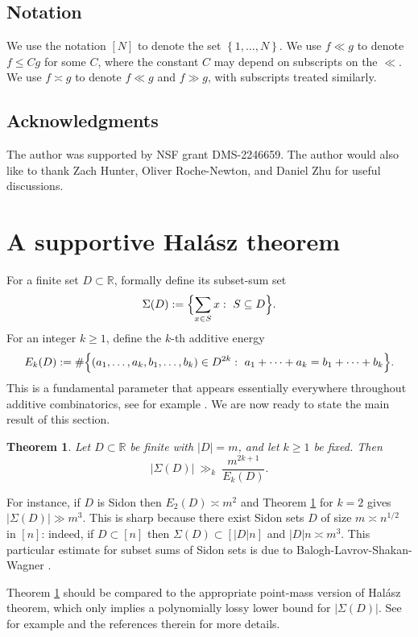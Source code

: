 \documentclass[12pt]{amsart}
\newtheorem{theorem}{Theorem}[section]
\theoremstyle{definition}
\theoremstyle{remark}
\newcommand{\RR}{\mathbb{R}}
\newcommand{\abs}[1]{\left|#1\right|}
\newcommand{\bigset}[1]{\Bigl\{#1\Bigr\}}
\newcommand{\Sig}{\Sigma}
\begin{document}
\smallskip
\subsection*{Notation} We use the notation $[N]$ to denote the set $\left\{1,\ldots,N\right\}$. We use $f \ll g$ to denote $f \leq Cg$ for some $C$, where the constant $C$ may depend on subscripts on the $\ll$. We use $f \asymp g$ to denote $f \ll g$ and $f \gg g$, with subscripts treated similarly.

\smallskip
\subsection*{Acknowledgments} 
The author was supported by NSF grant DMS-2246659. The author would also like to thank Zach Hunter, Oliver Roche-Newton, and Daniel Zhu for useful discussions.  

\smallskip
\section{A supportive Hal\'asz theorem} \label{sec:supportive}

For a finite set $D\subset\RR$, formally define its subset-sum set
\[
\Sig(D):=\bigset{\sum_{x\in S}x:\ S\subseteq D}.
\]
For an integer $k\ge 1$, define the $k$-th additive energy
\[
E_k(D):=\#\bigset{(a_1,\dots,a_k,b_1,\dots,b_k)\in D^{2k}:\ a_1+\cdots+a_k=b_1+\cdots+b_k}.
\]
This is a fundamental parameter that appears essentially everywhere throughout additive combinatorics, see for example \cite{TaoVu06}. We are now ready to state the main result of this section. 

\begin{theorem}\label{thm:support-halasz}
Let $D \subset\RR$ be finite with $\abs{D}=m$, and let $k\ge 1$ be fixed. Then
\[
\abs{\Sig(D)}\ \gg_k\ \frac{m^{2k+1}}{E_k(D)}.
\]
\end{theorem}

For instance, if $D$ is Sidon then $E_2(D)\asymp m^2$ and Theorem \ref{thm:support-halasz} for $k=2$ gives $\abs{\Sig(D)}\gg m^3$. This is sharp because there exist Sidon sets $D$ of size $m \asymp n^{1/2}$ in $[n]$: indeed, if $D \subset [n]$ then $\Sigma(D) \subset [|D|n]$ and $|D|n \asymp m^{3}$. This particular estimate for subset sums of Sidon sets is due to Balogh-Lavrov-Shakan-Wagner \cite{BLSW18}.

Theorem \ref{thm:support-halasz} should be compared to the appropriate point-mass version of Hal\'asz theorem, which only implies a polynomially lossy lower bound for $\abs{\Sig(D)}$. See for example \cite[Corollary 6.3]{NguyenVu13} and the references therein for more details. 
\end{document}
